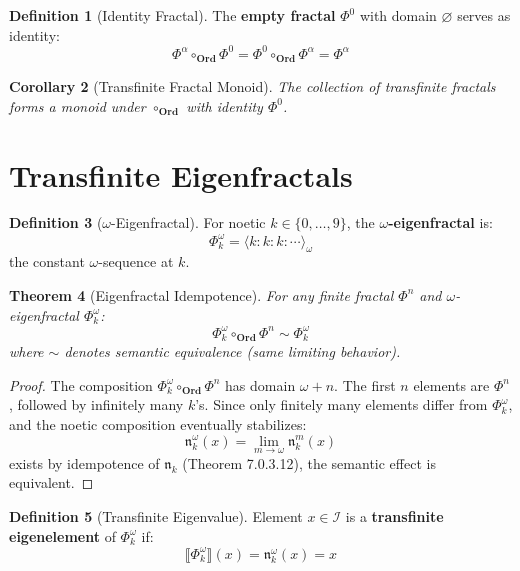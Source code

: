 \documentclass[11pt,twoside,openright]{book}
\theoremstyle{definition}
\newtheorem{definition}{Definition}[chapter]
\theoremstyle{plain}
\newtheorem{theorem}[definition]{Theorem}
\newtheorem{corollary}[definition]{Corollary}
\theoremstyle{remark}
\newcommand{\sem}[1]{\llbracket #1 \rrbracket}
\newcommand{\Ideas}{\mathcal{I}}
\newcommand{\Ord}{\mathbf{Ord}}              %
\newcommand{\TransFrac}[1]{\Phi^{#1}}        %
\begin{document}
\begin{definition}[Identity Fractal]
\label{def:identity-fractal}
The \textbf{empty fractal} $\TransFrac{0}$ with domain $\varnothing$ serves as identity:
\[
\TransFrac{\alpha} \circ_\Ord \TransFrac{0} = \TransFrac{0} \circ_\Ord \TransFrac{\alpha} = \TransFrac{\alpha}
\]
\end{definition}

\begin{corollary}[Transfinite Fractal Monoid]
\label{cor:transfinite-monoid}
The collection of transfinite fractals forms a monoid under $\circ_\Ord$ with identity $\TransFrac{0}$.
\end{corollary}

\section{Transfinite Eigenfractals}

\begin{definition}[$\omega$-Eigenfractal]
\label{def:omega-eigenfractal}
For noetic $k \in \{0, \ldots, 9\}$, the \textbf{$\omega$-eigenfractal} is:
\[
\TransFrac{\omega}_k = \langle k : k : k : \cdots \rangle_\omega
\]
the constant $\omega$-sequence at $k$.
\end{definition}

\begin{theorem}[Eigenfractal Idempotence]
\label{thm:omega-eigen-idem}
For any finite fractal $\TransFrac{n}$ and $\omega$-eigenfractal $\TransFrac{\omega}_k$:
\[
\TransFrac{\omega}_k \circ_\Ord \TransFrac{n} \sim \TransFrac{\omega}_k
\]
where $\sim$ denotes semantic equivalence (same limiting behavior).
\end{theorem}

\begin{proof}
The composition $\TransFrac{\omega}_k \circ_\Ord \TransFrac{n}$ has domain $\omega + n$. The first $n$ elements are $\TransFrac{n}$, followed by infinitely many $k$'s. Since only finitely many elements differ from $\TransFrac{\omega}_k$, and the noetic composition eventually stabilizes:
\[
\mathfrak{n}_{k}^{\omega}(x) = \lim_{m \to \omega} \mathfrak{n}_{k}^m(x)
\]
exists by idempotence of $\mathfrak{n}_k$ (Theorem 7.0.3.12), the semantic effect is equivalent.
\end{proof}

\begin{definition}[Transfinite Eigenvalue]
\label{def:transfinite-eigenvalue}
Element $x \in \Ideas$ is a \textbf{transfinite eigenelement} of $\TransFrac{\omega}_k$ if:
\[
\sem{\TransFrac{\omega}_k}(x) = \mathfrak{n}_k^\omega(x) = x
\]
\end{definition}
\end{document}

